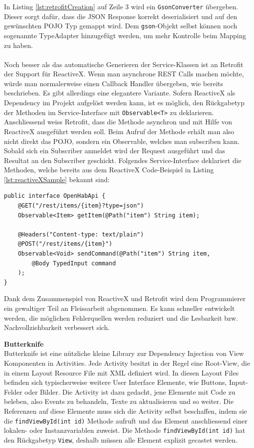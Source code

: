 In Listing \ref{lst:retrofitCreation} auf Zeile 3 wird ein \lstinline!GsonConverter! übergeben. Dieser sorgt dafür, dass die JSON Response korrekt deserialisiert und auf den gewünschten POJO Typ gemappt wird. Dem \lstinline!gson!-Objekt selbst können noch sogenannte TypeAdapter hinzugefügt werden, um mehr Kontrolle beim Mapping zu haben.\\
\\ 
Noch besser als das automatische Generieren der Service-Klassen ist an Retrofit der Support für ReactiveX. Wenn man asynchrone REST Calls machen möchte, würde man normalerweise einen Callback Handler übergeben, wie bereits beschrieben. Es gibt allerdings eine elegantere Variante. Sofern ReactiveX als Dependency im Projekt aufgelöst werden kann, ist es möglich, den Rückgabetyp der Methoden im Service-Interface mit \lstinline!Observable<T>! zu deklarieren. Anschliessend weiss Retrofit, dass die Methode asynchron und mit Hilfe von ReactiveX ausgeführt werden soll. Beim Aufruf der Methode erhält man also nicht direkt das POJO, sondern ein Observable, welches man subscriben kann. Sobald sich ein Subscriber anmeldet wird der Request ausgeführt und das Resultat an den Subscriber geschickt. Folgendes Service-Interface deklariert die Methoden, welche bereits aus dem ReactiveX Code-Beispiel in Listing \ref{lst:reactiveXSample} bekannt sind:

\begin{lstlisting}[style=csharp, label=lst:retrofitInterface, caption=OpenHabApi Service-Interface]
public interface OpenHabApi {
	@GET("/rest/items/{item}?type=json")
	Observable<Item> getItem(@Path("item") String item);
    
	@Headers("Content-type: text/plain")
	@POST("/rest/items/{item}")
	Observable<Void> sendCommand(@Path("item") String item, 
		@Body TypedInput command
	);
}
\end{lstlisting}

Dank dem Zusammenspiel von ReactiveX und Retrofit wird dem Programmierer ein gewaltiger Teil an Fleissarbeit abgenommen. Es kann schneller entwickelt werden, die möglichen Fehlerquellen werden reduziert und die Lesbarkeit bzw. Nachvollziehbarkeit verbessert sich.


\textbf{Butterknife} \\
Butterknife ist eine nützliche kleine Library zur Dependency Injection von View Komponenten in Activities. Jede Activity besitzt in der Regel eine Root-View, die in einem Layout Resource File mit XML definiert wird. In diesen Layout Files befinden sich typischerweise weitere User Interface Elemente, wie Buttons, Input-Felder oder Bilder. Die Activity ist dazu gedacht, jene Elemente mit Code zu beleben, also Events zu behandeln, Texte zu aktualisieren und so weiter. Die Referenzen auf diese Elemente muss sich die Activity selbst beschaffen, indem sie die \lstinline!findViewById(int id)! Methode aufruft und das Element anschliessend einer lokalen- oder Instanzvariablen zuweist. Die Methode \lstinline!findViewById(int id)! hat den Rückgabetyp \lstinline!View!, deshalb müssen alle Element explizit gecastet werden.\\

